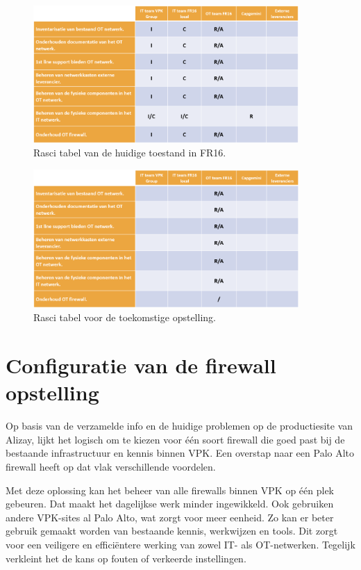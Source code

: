 \begin{figure}[H]
    \centering
    \includegraphics[width=0.9\textwidth]{fotos/Rasci_AS-IS.png}
    \caption[Foto Rasci AS-IS]{\label{fig:grail}Rasci tabel van de huidige toestand in FR16.}
\end{figure} 

\begin{figure}[H]
    \centering
    \includegraphics[width=0.9\textwidth]{fotos/Rasci_TO-BE.png}
    \caption[Foto Rasci TO-BE]{\label{fig:grail}Rasci tabel voor de toekomstige opstelling.}
\end{figure} 



\chapter{Configuratie van de firewall opstelling}

Op basis van de verzamelde info en de huidige problemen op de productiesite van Alizay, lijkt het logisch om te kiezen voor één soort firewall die goed past bij de bestaande infrastructuur en kennis binnen VPK. Een overstap naar een Palo Alto firewall heeft op dat vlak verschillende voordelen.

Met deze oplossing kan het beheer van alle firewalls binnen VPK op één plek gebeuren. Dat maakt het dagelijkse werk minder ingewikkeld. Ook gebruiken andere VPK-sites al Palo Alto, wat zorgt voor meer eenheid. Zo kan er beter gebruik gemaakt worden van bestaande kennis, werkwijzen en tools. Dit zorgt voor een veiligere en efficiëntere werking van zowel IT- als OT-netwerken. Tegelijk verkleint het de kans op fouten of verkeerde instellingen.


